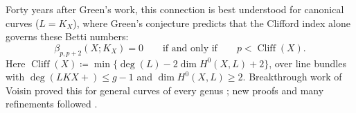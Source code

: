\documentclass[11pt,reqno]{amsart}
\theoremstyle{remark}
\newcommand{\cliff}{\operatorname{Cliff}}
\newcommand{\QQ}{\mathbb{Q}}
\begin{document}
Forty years after Green's work, this connection is best understood for canonical curves ($L=K_X$), where Green's conjecture \cite{green84-I} predicts that the Clifford index alone governs these Betti numbers:
\begin{equation}\label{eq:greens}
\beta_{p,p+2}(X;K_X)=0 \quad \quad \text{if and only if} \quad \quad p<\cliff(X).
\end{equation}
Here $\cliff(X)\coloneqq \min \{\deg(L) - 2 \dim H^{0}(X,L)+2\}$, over line bundles with $\deg(LKX+) \leq g-1$ and $\dim H^0(X,L) \geq 2$. Breakthrough work of Voisin proved this for general curves of every genus \cite{voisin02,voisin05}; new proofs \cite{aprodu19,kemeny21} and many refinements followed \cite{farkasMustataPopa03,chiodoEFS13,farkasKemeny16,farkasKemeny17,deopurkar18,kemeny24}.


\end{document}
